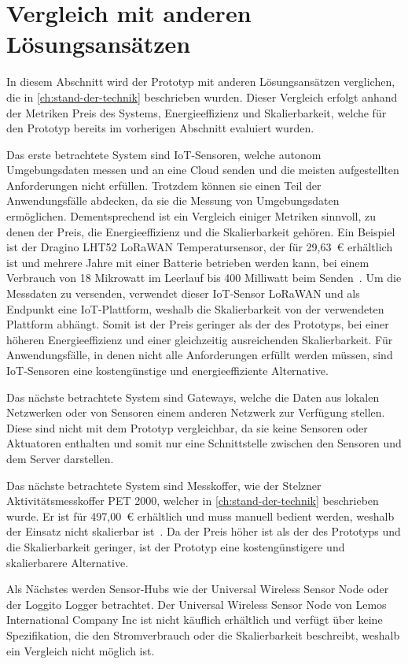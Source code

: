 \section{Vergleich mit anderen Lösungsansätzen}
In diesem Abschnitt wird der Prototyp mit anderen Lösungsansätzen verglichen, die in \cref{ch:stand-der-technik} beschrieben wurden.
Dieser Vergleich erfolgt anhand der Metriken Preis des Systems, Energieeffizienz und Skalierbarkeit, welche für den Prototyp bereits im vorherigen Abschnitt evaluiert wurden.

Das erste betrachtete System sind IoT-Sensoren, welche autonom Umgebungsdaten messen und an eine Cloud senden und die meisten aufgestellten Anforderungen nicht erfüllen.
Trotzdem können sie einen Teil der Anwendungsfälle abdecken, da sie die Messung von Umgebungsdaten ermöglichen.
Dementsprechend ist ein Vergleich einiger Metriken sinnvoll, zu denen der Preis, die Energieeffizienz und die Skalierbarkeit gehören.
Ein Beispiel ist der Dragino LHT52 LoRaWAN Temperatursensor, der für 29,63~€ erhältlich ist und mehrere Jahre mit einer Batterie betrieben werden kann, bei einem Verbrauch von 18 Mikrowatt im Leerlauf bis 400 Milliwatt beim Senden~\cite{LHT52}.
Um die Messdaten zu versenden, verwendet dieser IoT-Sensor LoRaWAN und als Endpunkt eine IoT-Plattform, weshalb die Skalierbarkeit von der verwendeten Plattform abhängt.
Somit ist der Preis geringer als der des Prototyps, bei einer höheren Energieeffizienz und einer gleichzeitig ausreichenden Skalierbarkeit.
Für Anwendungsfälle, in denen nicht alle Anforderungen erfüllt werden müssen, sind IoT-Sensoren eine kostengünstige und energieeffiziente Alternative.

Das nächste betrachtete System sind Gateways, welche die Daten aus lokalen Netzwerken oder von Sensoren einem anderen Netzwerk zur Verfügung stellen.
Diese sind nicht mit dem Prototyp vergleichbar, da sie keine Sensoren oder Aktuatoren enthalten und somit nur eine Schnittstelle zwischen den Sensoren und dem Server darstellen.

Das nächste betrachtete System sind Messkoffer, wie der Stelzner Aktivitätsmesskoffer PET 2000, welcher in \cref{ch:stand-der-technik} beschrieben wurde.
Er ist für 497,00~€ erhältlich und muss manuell bedient werden, weshalb der Einsatz nicht skalierbar ist~\cite{Stelzner}.
Da der Preis höher ist als der des Prototyps und die Skalierbarkeit geringer, ist der Prototyp eine kostengünstigere und skalierbarere Alternative.

Als Nächstes werden Sensor-Hubs wie der Universal Wireless Sensor Node oder der Loggito Logger betrachtet.
Der Universal Wireless Sensor Node von Lemos International Company Inc ist nicht käuflich erhältlich und verfügt über keine Spezifikation, die den Stromverbrauch oder die Skalierbarkeit beschreibt, weshalb ein Vergleich nicht möglich ist.

